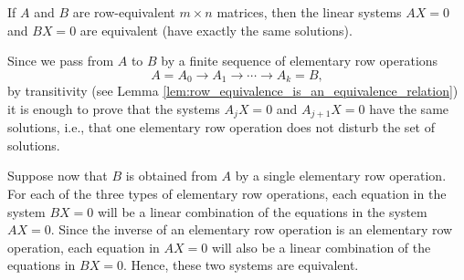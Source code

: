 \documentclass[12pt,letterpaper,reqno]{article}
\numberwithin{equation}{section}
\begin{document}
\begin{thm}\label{thm:row_equivalence_implies_equivalence}
	If $A$ and $B$ are row-equivalent $m \times n$ matrices, then the linear systems $AX=0$ and $BX=0$ are equivalent (have exactly the same solutions).	
\end{thm}

\begin{pf}
	Since we pass from $A$ to $B$ by a finite sequence of elementary row operations
$$A=A_0 \to A_1 \to \cdots \to A_k=B,$$
by transitivity (see Lemma \ref{lem:row_equivalence_is_an_equivalence_relation}) it is enough to prove that the systems $A_jX=0$ and $A_{j+1}X=0$ have the same solutions, i.e., that one elementary row operation does not disturb the set of solutions. 

 Suppose now that $B$ is obtained from $A$ by a single elementary row operation. For each of the three types of elementary row operations, each equation in the system $BX=0$ will be a linear combination of the equations in the system $AX=0$. Since the inverse of an elementary row operation is an elementary row operation, each equation in $AX=0$ will also be a linear combination of the equations in $BX=0$. Hence, these two systems are equivalent.
\end{pf}
\end{document}
